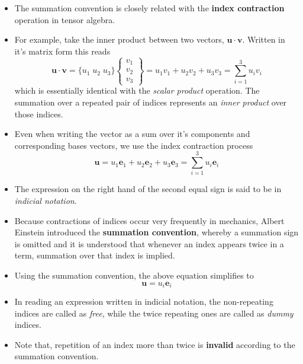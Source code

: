 \documentclass[11pt]{article}
\begin{document}
\begin{itemize}
\item The summation convention is closely related with the \textbf{index contraction} operation in tensor algebra.
\end{itemize}
\begin{itemize}
\item For example, take the inner product between two vectors, \(\boldsymbol{u} \cdot \boldsymbol{v}\). Written in it's matrix form this reads
$$ \boldsymbol{u} \cdot \boldsymbol{v} = \{ u_1 \; u_2 \; u_3 \} \left\{ \begin{array}{c} v_1 \\ v_2 \\ v_3 \end{array} \right\} = u_1 v_1 + u_2 v_2 + u_3 v_3 = \sum_{i=1}^3 u_i v_i $$
which is essentially identical with the \emph{scalar product} operation. The summation over a repeated pair of indices represents an \emph{inner product} over those indices.
\end{itemize}

\begin{itemize}
\item Even when writing the vector as a sum over it's components and corresponding bases vectors, we use the index contraction process
$$ \boldsymbol{u} = u_1 \boldsymbol{e}_1 +  u_2 \boldsymbol{e}_2 +  u_3 \boldsymbol{e}_3 = \sum_{i=1}^3 u_i \boldsymbol{e}_i $$
\end{itemize}
\begin{itemize}
\item The expression on the right hand of the second equal sign is said to be in \emph{indicial notation}.
\item Because contractions of indices occur very frequently in mechanics, Albert Einstein introduced the \textbf{summation convention}, whereby a summation sign is omitted and it is understood that whenever an index appears twice in a term, summation over that index is implied.
\item Using the summation convention, the above equation simplifies to
$$ \boldsymbol{u} =  u_i \boldsymbol{e}_i $$
\item In reading an expression written in indicial notation, the non-repeating indices are called as \emph{free}, while the twice repeating ones are called as \emph{dummy} indices.
\item Note that, repetition of an index more than twice is \textbf{invalid} according to the summation convention.
\end{itemize}
\end{document}
